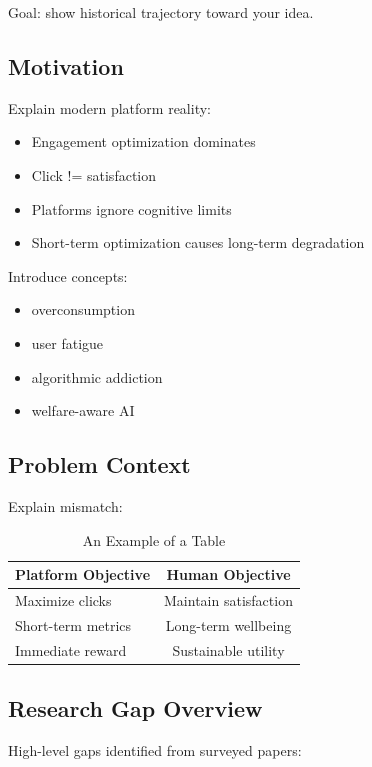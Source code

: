 \documentclass[lettersize,journal]{IEEEtran}
\begin{document}
Goal: show historical trajectory toward your idea.

\subsection{Motivation}

Explain modern platform reality:

\begin{itemize}
    \item Engagement optimization dominates
    \item Click != satisfaction
    \item Platforms ignore cognitive limits
    \item Short-term optimization causes long-term degradation
\end{itemize}

Introduce concepts:

\begin{itemize}
    \item overconsumption
    \item user fatigue
    \item algorithmic addiction
    \item welfare-aware AI
\end{itemize}

\subsection{Problem Context}

Explain mismatch:

\begin{table}[!t]
\caption{An Example of a Table\label{tab:tableABDDC}}
\centering
\begin{tabular}{|l||c|}
\hline
Platform Objective & Human Objective \\
\hline
Maximize clicks & Maintain satisfaction \\
Short-term metrics & Long-term wellbeing \\
Immediate reward & Sustainable utility \\
\hline
\end{tabular}
\end{table}

\subsection{Research Gap Overview}

High-level gaps identified from surveyed papers:
\end{document}
